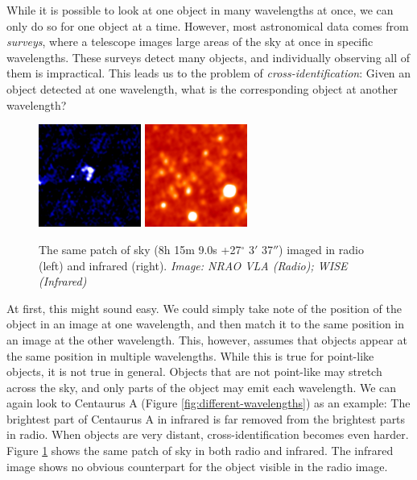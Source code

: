 While it is possible to look at one object in many wavelengths at once, we can
only do so for one object at a time. However, most astronomical data comes from
\emph{surveys}, where a telescope images large areas of the sky at once in
specific wavelengths. These surveys detect many objects, and individually
observing all of them is impractical. This leads us to the problem of
\emph{cross-identification}: Given an object detected at one wavelength, what
is the corresponding object at another wavelength?

\begin{figure}
  \centering
  \includegraphics[width=0.3\textwidth]{images/first_FIRSTJ081509.0+270337.jpg}
  \includegraphics[width=0.3\textwidth]{images/wise_FIRSTJ081509.0+270337.jpg}
  \caption{The same patch of sky (8h 15m 9.0s +27$^\circ$ 3$'$ 37$''$) imaged in
    radio (left) and infrared (right). \emph{Image: NRAO VLA (Radio); WISE
    (Infrared)}}
  \label{fig:radio-ir-comparison}
\end{figure}

At first, this might sound easy. We could simply take note of the position of
the object in an image at one wavelength, and then match it to the same
position in an image at the other wavelength. This, however, assumes that
objects appear at the same position in multiple wavelengths. While this is
true for point-like objects, it is not true in general. Objects that are not
point-like may stretch across the sky, and only parts of the object may emit
each wavelength. We can again look to Centaurus A (Figure
\ref{fig:different-wavelengths}) as an example: The brightest part of
Centaurus A in infrared is far removed from the brightest parts in radio. When
objects are very distant, cross-identification becomes even harder. Figure
\ref{fig:radio-ir-comparison} shows the same patch of sky in both radio and
infrared. The infrared image shows no obvious counterpart for the object visible
in the radio image.

